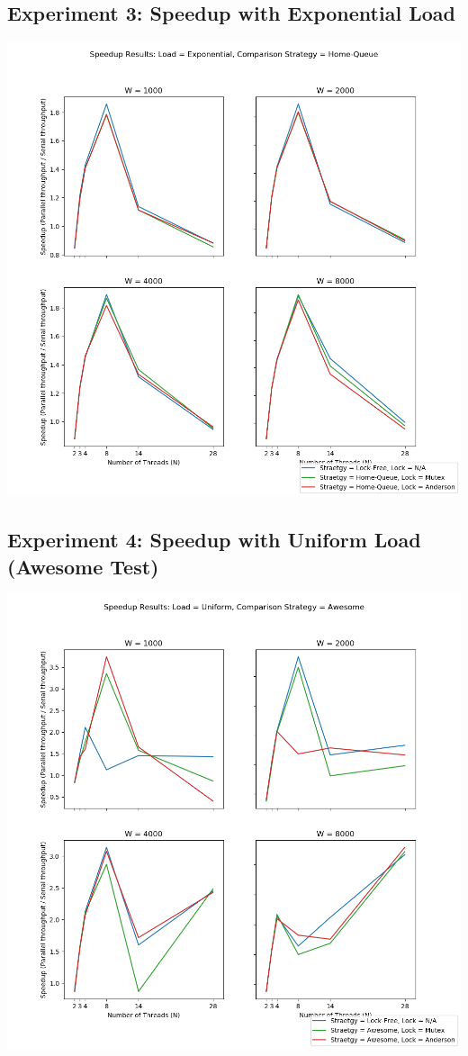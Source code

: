 \documentclass[]{article}
\begin{document}
\subsection{Experiment 3: Speedup with Exponential Load}
\includegraphics[scale=0.5]{graphs/speedup_f:H.png}\\
\subsection{Experiment 4: Speedup with Uniform Load (Awesome Test)}
\includegraphics[scale=0.5]{graphs/speedup_t:A.png}\\
\end{document}
